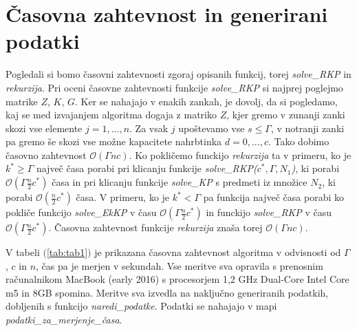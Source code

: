 \documentclass[a4paper,12pt]{article}
\theoremstyle{definition}
\begin{document}
\newpage
\section{Časovna zahtevnost in generirani podatki}
\medskip
Pogledali si bomo časovni zahtevnosti zgoraj opisanih funkcij, torej \textit{solve\_RKP}
in \textit{rekurzija}. 
Pri oceni časovne zahtevnosti funkcije \textit{solve\_RKP} 
si najprej poglejmo matrike $Z$, $K$, $G$. Ker se nahajajo v enakih 
zankah, je dovolj, da si pogledamo, kaj se med izvajanjem algoritma
dogaja z matriko $Z$, kjer gremo v zunanji zanki skozi vse elemente $j = 1, ...,n$.
Za vsak $j$ upoštevamo vse $s \leq \Gamma$, v notranji zanki pa gremo še
skozi vse možne kapacitete nahrbtinka $d = 0, ..., c$. Tako dobimo časovno zahtevnost
$\mathcal{O}(\Gamma n c)$.
Ko pokličemo funckijo \textit{rekurzija} ta v primeru,
ko je $k^* \geq \Gamma$ največ 
časa porabi pri klicanju funkcije \textit{solve\_RKP($c^*, \Gamma, N_1$)},
ki porabi $\mathcal{O}(\Gamma \frac{n}{2} c^*)$ časa in pri klicanju funkcije \textit{solve\_KP} s predmeti iz množice 
$N_2$, ki porabi $\mathcal{O}(\frac{n}{2} c^*)$ časa. V primeru,
 ko je $k^* < \Gamma$ pa funkcija največ časa porabi ko pokliče funkcijo \textit{solve\_EkKP} v času $\mathcal{O}(\Gamma \frac{n}{2} c^*)$
 in funckijo \textit{solve\_RKP} v času $\mathcal{O}(\Gamma \frac{n}{2} c^*)$. Časovna zahtevnost funkcije \textit{rekurzija}
 znaša torej $\mathcal{O}(\Gamma n c)$.
 \par
 V tabeli $($\ref{tab:tab1}$)$ je prikazana časovna zahtevnost algoritma v odvisnosti od $\Gamma$, $c$ in $n$, čas pa je merjen v sekundah.
 Vse meritve sva opravila s prenosnim računalnikom MacBook (early 2016) s procesorjem 1,2 GHz Dual-Core Intel Core m5 in 8GB spomina.
  Meritve sva izvedla na naključno generiranih podatkih, dobljenih s funkcijo \textit{naredi\_podatke}.
 Podatki se nahajajo v mapi \textit{podatki\_za\_merjenje\_časa}.
 
     
 
\end{document}
